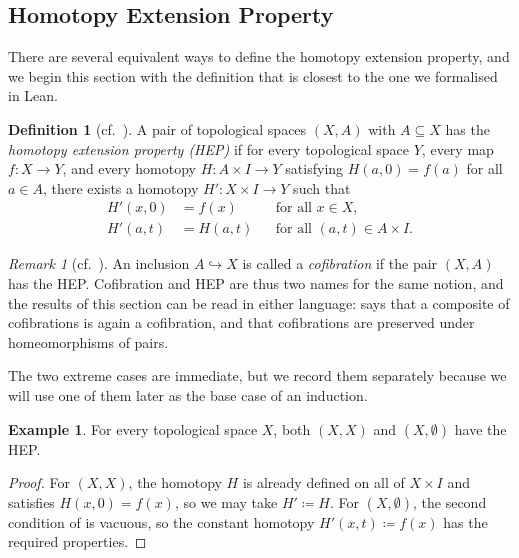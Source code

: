 \documentclass[11pt, a4paper, english]{article}
\theoremstyle{plain}
\theoremstyle{definition}
\newtheorem{definition}[theorem]{Definition}
\newtheorem{example}[theorem]{Example}
\theoremstyle{remark}
\newtheorem{remark}[theorem]{Remark}
\numberwithin{equation}{section}
\numberwithin{theorem}{section}
\begin{document}
\subsection{Homotopy Extension Property} \label{subsec:HEP}

There are several equivalent ways to define the homotopy extension property, and we begin this section with the definition that is closest to the one we formalised in Lean.

\begin{definition} [cf.\ {\cite[Bemerkung~1]{WAL}}] \label{def:HEP}
A pair of topological spaces $(X,A)$ with $A \subseteq X$ has the \emph{homotopy extension property (HEP)} if for every topological space $Y$, every map $f \colon X \to Y$, and every homotopy $H \colon A \times I \to Y$ satisfying $H(a,0) = f(a)$ for all $a \in A$, there exists a homotopy $H' \colon X \times I \to Y$ such that
\begin{align*}
    H'(x,0) &= f(x)    && \text{for all } x \in X, \\
    H'(a,t) &= H(a,t)  && \text{for all } (a,t) \in A \times I.
\end{align*}
\end{definition}

\begin{remark} [cf.\ {\cite[Definition 5.1.1]{Strom}}] \label{rem:cofibration}
    An inclusion $A \hookrightarrow X$ is called a \emph{cofibration} if the pair $(X,A)$ has the HEP. Cofibration and HEP are thus two names for the same notion, and the results of this section can be read in either language:  says that a composite of cofibrations is again a cofibration, and  that cofibrations are preserved under homeomorphisms of pairs.
\end{remark}

The two extreme cases are immediate, but we record them separately because we will use one of them later as the base case of an induction.

\begin{example} \label{example:HEPtrivial} 
     For every topological space $X$, both $(X,X)$ and $(X,\emptyset)$ have the HEP.
\end{example}
\begin{proof}
    For $(X,X)$, the homotopy $H$ is already defined on all of $X \times I$ and satisfies $H(x,0) = f(x)$, so we may take $H' \coloneqq H$. For $(X,\emptyset)$, the second condition of  is vacuous, so the constant homotopy $H'(x,t) \coloneqq f(x)$ has the required properties.
\end{proof}
\end{document}
